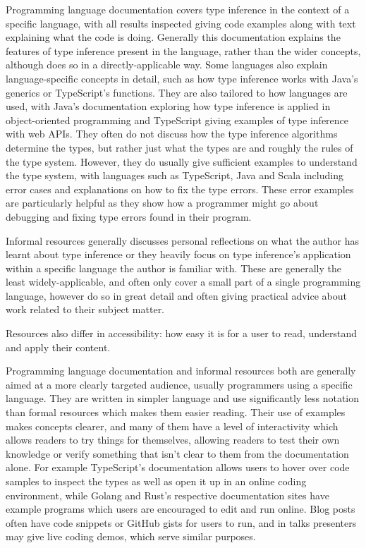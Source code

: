 \documentclass[a4paper,fleqn,oneside,12pt]{report}
\begin{document}
Programming language documentation covers type inference in the context of a specific language, with all results inspected giving code examples along with text explaining what the code is doing. Generally this documentation explains the features of type inference present in the language, rather than the wider concepts, although does so in a directly-applicable way. Some languages also explain language-specific concepts in detail, such as how type inference works with Java’s generics or TypeScript’s functions. They are also tailored to how languages are used, with Java’s documentation exploring how type inference is applied in object-oriented programming and TypeScript giving examples of type inference with web APIs. They often do not discuss how the type inference algorithms determine the types, but rather just what the types are and roughly the rules of the type system. However, they do usually give sufficient examples to understand the type system, with languages such as TypeScript, Java and Scala including error cases and explanations on how to fix the type errors. These error examples are particularly helpful as they show how a programmer might go about debugging and fixing type errors found in their program.

Informal resources generally discusses personal reflections on what the author has learnt about type inference or they heavily focus on type inference’s application within a specific language the author is familiar with. These are generally the least widely-applicable, and often only cover a small part of a single programming language, however do so in great detail and often giving practical advice about work related to their subject matter.

Resources also differ in accessibility: how easy it is for a user to read, understand and apply their content.

Programming language documentation and informal resources both are generally aimed at a more clearly targeted audience, usually programmers using a specific language. They are written in simpler language and use significantly less notation than formal resources which makes them easier reading. Their use of examples makes concepts clearer, and many of them have a level of interactivity which allows readers to try things for themselves, allowing readers to test their own knowledge or verify something that isn’t clear to them from the documentation alone. For example TypeScript’s documentation allows users to hover over code samples to inspect the types as well as open it up in an online coding environment, while Golang and Rust’s respective documentation sites have example programs which users are encouraged to edit and run online. Blog posts often have code snippets or GitHub gists for users to run, and in talks presenters may give live coding demos, which serve similar purposes.
\end{document}
